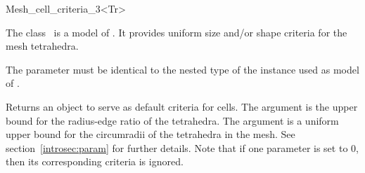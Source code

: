 \ccRefPageBegin


\begin{ccRefFunctionObjectClass}{Mesh_cell_criteria_3<Tr>}  %


\ccDefinition
  
The class \ccRefName\ is a model of . It provides
uniform size and/or shape criteria for the  mesh tetrahedra.


\ccParameters
The parameter  must be identical to the nested type
 of the instance used as model of
.

\ccIsModel
{}


\ccTypes


\ccCreation
{}  %

{Returns an object to serve as default criteria  for cells. The argument 
 is the  upper bound for the radius-edge ratio
of the tetrahedra. The argument  is a uniform upper bound
for the circumradii of the tetrahedra in the mesh. See
section~\ref{introsec:param} for further details.
Note that if one parameter is set to 0, then its corresponding criteria is ignored.}



\ccSeeAlso

 \\
 \\
 \\




\end{ccRefFunctionObjectClass}

\ccRefPageEnd

